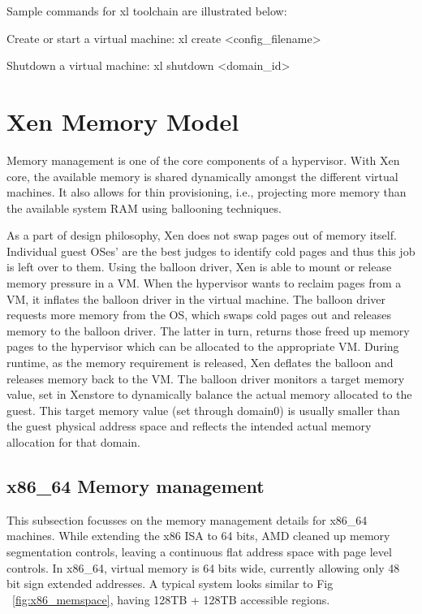  

Sample commands for xl toolchain are illustrated below: 

Create or start a virtual machine:  xl create <config\_filename> 

Shutdown a virtual machine:  xl shutdown <domain\_id> 


\section{Xen Memory Model}

Memory management is one of the core components of a hypervisor. With Xen core, the available memory is shared dynamically amongst the different virtual machines. It also allows for thin provisioning, i.e., projecting more memory than the available system RAM using ballooning techniques. 

 

As a part of design philosophy, Xen does not swap pages out of memory itself. Individual guest OSes’ are the best judges to identify cold pages and thus this job is left over to them. Using the balloon driver, Xen is able to mount or release memory pressure in a VM. When the hypervisor wants to reclaim pages from a VM, it inflates the balloon driver in the virtual machine. The balloon driver requests more memory from the OS, which swaps cold pages out and releases memory to the balloon driver. The latter in turn, returns those freed up memory pages to the hypervisor which can be allocated to the appropriate VM. During runtime, as the memory requirement is released, Xen deflates the balloon and releases memory back to the VM. The balloon driver monitors a target memory value, set in Xenstore to dynamically balance the actual memory allocated to the guest. This target memory value (set through domain0) is usually smaller than the guest physical address space and reflects the intended actual memory allocation for that domain. 

 

\subsection{x86\_64 Memory management}

This subsection focusses on the memory management details for x86\_64 machines. While extending the x86 ISA to 64 bits, AMD cleaned up memory segmentation controls, leaving a continuous flat address space with page level controls. In x86\_64, virtual memory is 64 bits wide, currently allowing only 48 bit sign extended addresses.  A typical system looks similar to Fig ~\ref{fig:x86_memspace}, having 128TB + 128TB accessible regions. 

